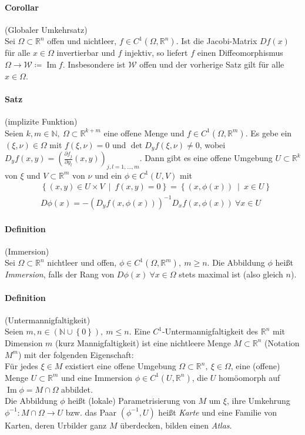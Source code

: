 \documentclass[12pt,a4paper,fleqn]{article}
\DeclareMathOperator{\im}{Im}
\def\set#1{{\left\{ #1 \right\}}}
\def\Mid{\ \middle|\ }
\def\R{{\mathbb{R}}}
\begin{document}
\paragraph{Corollar} (Globaler Umkehrsatz)\\
Sei $\Omega \subset \R^n$ offen und nichtleer, $f \in C^1 (\Omega, \R^n)$. Ist die Jacobi-Matrix $Df(x)$ für alle $x \in \Omega$ invertierbar und $f$ injektiv, so liefert $f$ einen Diffeomorphismus $\Omega \rightarrow \mathcal{W} \coloneqq \im f$. Insbesondere ist $\mathcal{W}$ offen und der vorherige Satz gilt für alle $x \in \Omega$.

\paragraph{Satz} (implizite Funktion)\\
Seien $k, m \in \mathbb{N},\ \Omega \subset \R^{k+m}$ eine offene Menge und $f \in C^1(\Omega, \R^m)$. Es gebe ein \mbox{$(\xi, \nu) \in \Omega$} mit $f(\xi, \nu) = 0$ und $\det D_yf(\xi, \nu) \not = 0$, wobei $D_yf(x, y) = \left(\frac{\partial f_j}{\partial y_l}(x, y)\right)_{j, l = 1, \dotsc, m}$. Dann gibt es eine offene Umgebung $U \subset \R^k$ von $\xi$ und $V \subset \R^m$ von $\nu$ und ein $\phi \in C^1(U, V)$ mit 
\begin{align*}
&\set{(x, y) \in U \times V \Mid f(x, y) = 0} = \set{(x, \phi(x)) \Mid x \in U}\\
&D\phi(x) = -(D_yf(x, \phi(x)))^{-1} D_xf(x, \phi(x))\ \forall x \in U
\end{align*}

\paragraph{Definition} (Immersion)\\
Sei $\Omega \subset \R^n$ nichtleer und offen, $\phi \in C^1(\Omega, \R^m),\ m \geq n$. Die Abbildung $\phi$ heißt \textit{Immersion}, falls der Rang von $D\phi(x)\ \forall x \in \Omega$ stets maximal ist (also gleich $n$).

\paragraph{Definition} (Untermannigfaltigkeit)\\
Seien $m, n \in (\mathbb{N} \cup \set{0}),\ m \leq n$. Eine $C^1$-Untermannigfaltigkeit des $\R^n$ mit Dimension $m$ (kurz Mannigfaltigkeit) ist eine nichtleere Menge $M \subset \R^n$ (Notation $M^m$) mit der folgenden Eigenschaft:\\
Für jedes $\xi \in M$ existiert eine offene Umgebung $\Omega \subset \R^n,\ \xi \in \Omega$, eine (offene) Menge $U \subset \R^m$ und eine Immersion $\phi \in C^1(U, \R^n)$, die $U$ homöomorph auf $\im \phi  = M \cap \Omega$ abbildet.\\
Die Abbildung $\phi$ heißt (lokale) Parametrisierung von $M$ um $\xi$, ihre Umkehrung $\phi^{-1}\colon M \cap \Omega \rightarrow U$ bzw. das Paar $(\phi^{-1}, U)$ heißt \textit{Karte} und eine Familie von Karten, deren Urbilder ganz $M$ überdecken, bilden einen \textit{Atlas}.
\end{document}
